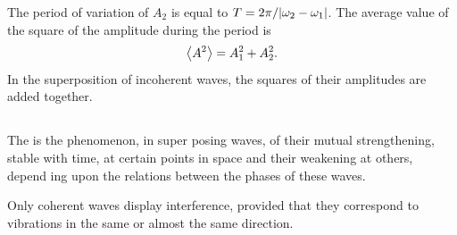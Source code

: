The period of variation of $A_{2}$ is equal to $T= 2\pi/\abs{\omega_{2} - \omega_{1}}$. The average value of the square of the amplitude during the period is
\begin{equation*}%
\expval{A^{2}} = A_{1}^{2} + A_{2}^{2}.
\end{equation*}
In the superposition of incoherent waves, the squares of their amplitudes are added together.

\subsection{}\label{30.5.2} The  is the phenomenon, in super­ posing waves, of their mutual strengthening, stable with time, at certain points in space and their weakening at others, depend­ ing upon the relations between the phases of these waves.

Only coherent waves display interference, provided that they correspond to vibrations in the same or almost the same direction.

